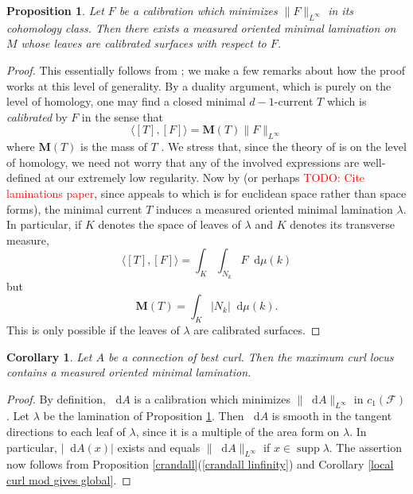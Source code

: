\documentclass[reqno,11pt]{amsart}
\newcommand*\dif{\mathop{}\!\mathrm{d}}
\DeclareMathOperator{\supp}{supp}
\newcommand{\dfn}[1]{\emph{#1}\index{#1}}
\newtheorem{proposition}[theorem]{Proposition}
\newtheorem{corollary}[theorem]{Corollary}
\theoremstyle{definition}
\numberwithin{equation}{section}
\newcommand\todo[1]{\textcolor{red}{TODO: #1}}
\begin{document}
\begin{proposition}\label{Bangert Cui}
Let $F$ be a calibration which minimizes $\|F\|_{L^\infty}$ in its cohomology class.
Then there exists a measured oriented minimal lamination on $M$ whose leaves are calibrated surfaces with respect to $F$.
\end{proposition}
\begin{proof}
This essentially follows from \cite[Theorem 5.1]{bangert_cui_2017}; we make a few remarks about how the proof works at this level of generality.
By a duality argument, which is purely on the level of homology, one may find a closed minimal $d-1$-current $T$ which is \dfn{calibrated} by $F$ in the sense that
$$\langle [T], [F]\rangle = \mathbf M(T) \|F\|_{L^\infty}$$
where $\mathbf M(T)$ is the mass of $T$ \cite[Proposition 2.2]{bangert_cui_2017}.
We stress that, since the theory of \cite[\S2C]{bangert_cui_2017} is on the level of homology, we need not worry that any of the involved expressions are well-defined at our extremely low regularity.
Now by \cite[Theorem 1]{AUER20011095} (or perhaps \todo{Cite laminations paper}, since \cite{AUER20011095} appeals to \cite[\S37]{Simon84} which is for euclidean space rather than space forms), the minimal current $T$ induces a measured oriented minimal lamination $\lambda$.
In particular, if $K$ denotes the space of leaves of $\lambda$ and $K$ denotes its transverse measure,
$$\langle [T], [F]\rangle = \int_K \int_{N_k} F \dif \mu(k)$$
but 
$$\mathbf M(T) = \int_K |N_k| \dif \mu(k).$$
This is only possible if the leaves of $\lambda$ are calibrated surfaces.
\end{proof}

\begin{corollary}\label{best curl lamination}
Let $A$ be a connection of best curl.
Then the maximum curl locus contains a measured oriented minimal lamination.
\end{corollary}
\begin{proof}
By definition, $\dif A$ is a calibration which minimizes $\|\dif A\|_{L^\infty}$ in $c_1(\mathscr F)$.
Let $\lambda$ be the lamination of Proposition \ref{Bangert Cui}.
Then $\dif A$ is smooth in the tangent directions to each leaf of $\lambda$, since it is a multiple of the area form on $\lambda$.
In particular, $|\dif A(x)|$ exists and equals $\|\dif A\|_{L^\infty}$ if $x \in \supp \lambda$.
The assertion now follows from Proposition \ref{crandall}(\ref{crandall linfinity}) and Corollary \ref{local curl mod gives global}.
\end{proof}
\end{document}
